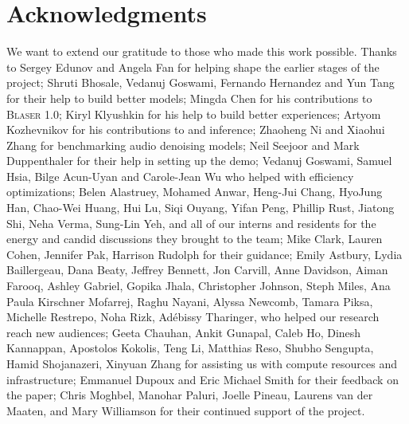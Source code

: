 \section*{Acknowledgments}
We want to extend our gratitude to those who made this work possible. Thanks to Sergey Edunov and Angela Fan for helping shape the earlier stages of the project; Shruti Bhosale, Vedanuj Goswami, Fernando Hernandez and Yun Tang for their help to build better models; Mingda Chen for his contributions to \textsc{Blaser 1.0}; Kiryl Klyushkin for his help to build better experiences; Artyom Kozhevnikov for his contributions to \fairseq and \sonar inference; Zhaoheng Ni and Xiaohui Zhang for benchmarking audio denoising models; Neil Seejoor and Mark Duppenthaler for their help in setting up the demo; 
Vedanuj Goswami, Samuel Hsia, Bilge Acun-Uyan and Carole-Jean Wu who helped with efficiency optimizations;
Belen Alastruey, Mohamed Anwar, Heng-Jui Chang, HyoJung Han, Chao-Wei Huang, Hui Lu, Siqi Ouyang, Yifan Peng, Phillip Rust, Jiatong Shi, Neha Verma, Sung-Lin Yeh, and all of our interns and residents for the energy and candid discussions they brought to the team; 
Mike Clark, Lauren Cohen, Jennifer Pak, Harrison Rudolph for their guidance; 
Emily Astbury, Lydia Baillergeau, Dana Beaty, Jeffrey Bennett, Jon Carvill,  Anne Davidson, Aiman Farooq, Ashley Gabriel, Gopika Jhala, Christopher Johnson, Steph Miles, Ana Paula Kirschner Mofarrej, Raghu Nayani, Alyssa Newcomb, Tamara Piksa, Michelle Restrepo, Noha Rizk, Adébissy Tharinger, who helped our research reach new audiences; 
Geeta Chauhan, Ankit Gunapal, Caleb Ho, Dinesh Kannappan, Apostolos Kokolis, Teng Li, Matthias Reso, Shubho Sengupta, Hamid Shojanazeri, Xinyuan Zhang for assisting us with compute resources and infrastructure;
Emmanuel Dupoux and Eric Michael Smith for their feedback on the paper;
Chris Moghbel,  Manohar Paluri, Joelle Pineau, Laurens van der Maaten, and Mary Williamson for their continued support of the project.